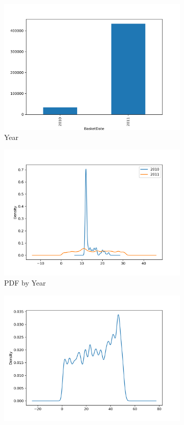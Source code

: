 \begin{figure}[!h]
\begin{subfigure}{.5\textwidth}
\centering
\includegraphics[width=.7\textwidth]{img/year_count.png}
\caption{Year}
\label{fig:year_count}
\end{subfigure}
\begin{subfigure}{.5\textwidth}
\centering
\includegraphics[width=.7\textwidth]{img/kde_year.png}
\caption{PDF by Year}
\label{fig:kde_year}
\end{subfigure}
\begin{subfigure}{.5\textwidth}
\centering
\includegraphics[width=.7\textwidth]{img/week_kde.png}

\end{subfigure}
\end{figure}
